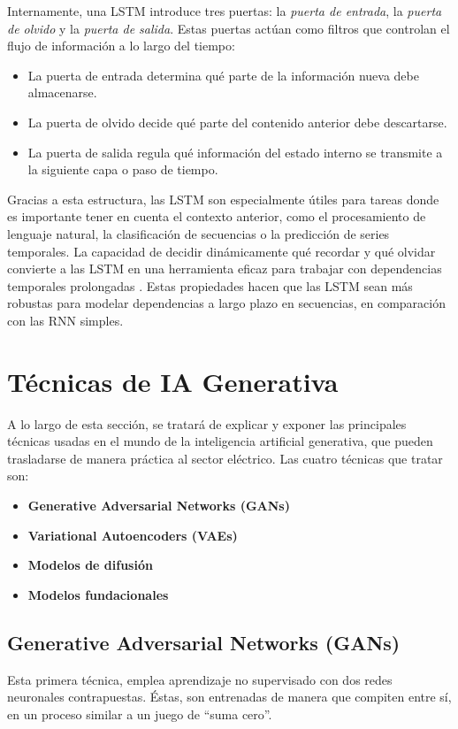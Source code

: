 Internamente, una LSTM introduce tres puertas: la \textit{puerta de entrada}, la 
\textit{puerta de olvido} y la \textit{puerta de salida}. Estas puertas actúan como filtros que 
controlan el flujo de información a lo largo del tiempo:
\begin{itemize}
    \item La puerta de entrada determina qué parte de la información nueva debe almacenarse.
    \item La puerta de olvido decide qué parte del contenido anterior debe descartarse.
    \item La puerta de salida regula qué información del estado interno se transmite a la 
    siguiente capa o paso de tiempo.
\end{itemize}

Gracias a esta estructura, las LSTM son especialmente útiles para tareas donde es importante 
tener en cuenta el contexto anterior, como el procesamiento de lenguaje natural, la clasificación 
de secuencias o la predicción de series temporales. La capacidad de decidir dinámicamente qué 
recordar y qué olvidar convierte a las LSTM en una herramienta eficaz para trabajar con 
dependencias temporales prolongadas \cite{calzone2020lstm}. Estas propiedades hacen que las LSTM 
sean más robustas para modelar dependencias a largo plazo en secuencias, en comparación con las RNN 
simples.

\section{Técnicas de IA Generativa}
A lo largo de esta sección, se tratará de explicar y exponer las principales técnicas usadas en el
mundo de la inteligencia artificial generativa, que pueden trasladarse de manera práctica al 
sector eléctrico. Las cuatro técnicas que tratar son:

\begin{itemize}
    \item \textbf{Generative Adversarial Networks (GANs)}
    \item \textbf{Variational Autoencoders (VAEs)}
    \item \textbf{Modelos de difusión}
    \item \textbf{Modelos fundacionales}
\end{itemize}

\subsection{Generative Adversarial Networks (GANs)}
Esta primera técnica, emplea aprendizaje no supervisado con dos redes neuronales contrapuestas. 
Éstas, son entrenadas de manera que compiten entre sí, en un proceso similar a un juego de “suma 
cero”.\\

